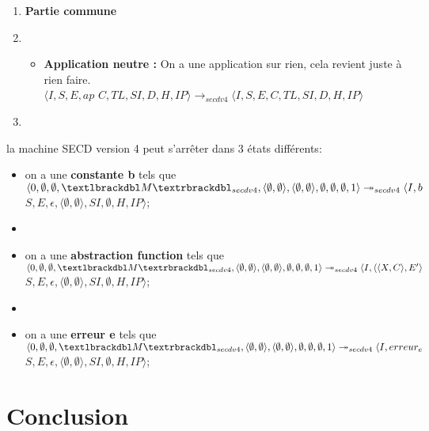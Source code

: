 \documentclass[10pt,a4paper]{article}
\begin{document}
\begin{enumerate}
\begin{itemize}
		    	\end{itemize}
			    \item[] \textbf{Partie commune} 
			   	\item[]
			   	\begin{itemize}
			   		\item[] \textbf{Application neutre :} On a une application sur rien, cela revient juste à rien faire.
			     	\\ $\langle I,S,E,ap$ $C,TL,SI,D,H,IP\rangle
			   		\longrightarrow_{secdv4} \langle I,S,E,C,TL,SI,D,H,IP\rangle$
			   	\end{itemize}
			    
				\item[]
			\end{enumerate}
		
			\bigbreak
			\bigbreak
			la machine SECD version 4 peut s'arrêter dans 3 états différents:
			\begin{itemize}
				\item[] on a une \textbf{constante b} tels que $\langle 0,\emptyset,\emptyset,\textlbrackdbl M\textrbrackdbl_{secdv4},\langle\emptyset,\emptyset\rangle,\langle\emptyset,\emptyset\rangle,\emptyset,\emptyset,\emptyset,1\rangle \\
				\twoheadrightarrow_{secdv4} \langle I,b$ $S,E,\epsilon,\langle\emptyset,\emptyset\rangle,SI,\emptyset,H,IP\rangle$;
				\item[] 
				\item[] on a une \textbf{abstraction function} tels que
				$\langle 0,\emptyset,\emptyset,\textlbrackdbl M\textrbrackdbl_{secdv4},\langle\emptyset,\emptyset\rangle,\langle\emptyset,\emptyset\rangle,\emptyset,\emptyset,\emptyset,1\rangle \\
				\twoheadrightarrow_{secdv4} \langle I,\langle\langle X,C\rangle,E'\rangle$ $S,E,\epsilon,\langle\emptyset,\emptyset\rangle,SI,\emptyset,H,IP\rangle$;
				\item[] 
				\item[] on a une \textbf{erreur e} tels que 
				$\langle 0,\emptyset,\emptyset,\textlbrackdbl M\textrbrackdbl_{secdv4},\langle\emptyset,\emptyset\rangle,\langle\emptyset,\emptyset\rangle,\emptyset,\emptyset,\emptyset,1\rangle \\
				\twoheadrightarrow_{secdv4} \langle I,erreur_{e}$ $S,E,\epsilon,\langle\emptyset,\emptyset\rangle,SI,\emptyset,H,IP\rangle$;
			\end{itemize}
		\newpage
		\section{Conclusion}
		
\end{document}
